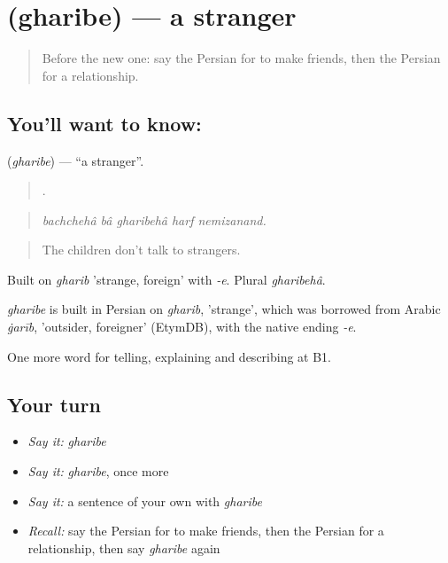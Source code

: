 \section[\texorpdfstring{\fa{غریبه} (gharibe)}{غریبه (gharibe)}]{ (gharibe) — a stranger}

\label{lesson:FA-C504-gharibe}



\begin{quote}
Before the new one: say the Persian for to make friends, then the Persian for a relationship.
\end{quote}

\subsection*{You'll want to know: }
\textbf{} (\emph{gharibe}) — \textquotedblleft{}a stranger\textquotedblright{}.

\begin{quote}
      .
\end{quote}

\begin{quote}
\emph{bachchehâ bâ gharibehâ harf nemizanand.}
\end{quote}

\begin{quote}
The children don't talk to strangers.
\end{quote}

Built on \emph{gharib} 'strange, foreign' with \emph{-e}. Plural \emph{gharibehâ}.

\begin{cousinweb}
\emph{gharibe} is built in Persian on \emph{gharib}, 'strange', which was borrowed from Arabic \emph{ġarīb}, 'outsider, foreigner' (EtymDB), with the native ending \emph{-e}.
\end{cousinweb}

\begin{grammarlens}[title={What you've built}]
One more word for telling, explaining and describing at B1.
\end{grammarlens}

\subsection*{Your turn}
\begin{itemize}
\raggedright
  \item \emph{Say it:} \emph{gharibe}
  \item \emph{Say it:} \emph{gharibe}, once more
  \item \emph{Say it:} a sentence of your own with \emph{gharibe}
  \item \emph{Recall:} say the Persian for to make friends, then the Persian for a relationship, then say \emph{gharibe} again
\end{itemize}

